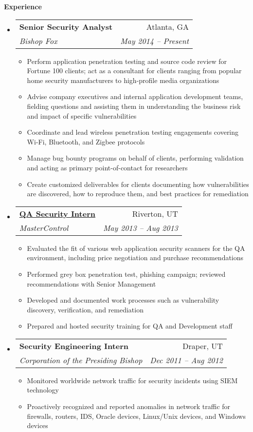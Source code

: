 \documentclass[letterpaper,11pt]{article}
\makeatletter
\newcommand{\resitem}[1]{\item #1 \vspace{-2pt}}
\newcommand{\resheading}[1]{{\large \colorbox{mygrey}{\begin{minipage}{\textwidth}{\textbf{#1 \vphantom{p\^{E}}}}\end{minipage}}}}
\newcommand{\ressubheading}[4]{
\begin{tabular*}{6.5in}{l@{\extracolsep{\fill}}r}
		\textbf{#1} & #2 \\
		\textit{#3} & \textit{#4} \\
\end{tabular*}\vspace{-6pt}}
\makeatother
\begin{document}
\resheading{Experience}
	\begin{itemize}
	\item
			\ressubheading{Senior Security Analyst}{Atlanta, GA}{Bishop Fox}{May 2014 -- Present}
			{ \footnotesize
			\begin{itemize}
				\resitem{Perform application penetration testing and source code review for Fortune 100 clients; act as a consultant for clients ranging from popular home security manufacturers to high-profile media organizations}
				\resitem{Advise company executives and internal application development teams, fielding questions and assisting them in understanding the business risk and impact of specific vulnerabilities}
				\resitem{Coordinate and lead wireless penetration testing engagements covering Wi-Fi, Bluetooth, and Zigbee protocols}
				\resitem{Manage bug bounty programs on behalf of clients, performing validation and acting as primary point-of-contact for researchers}
				\resitem{Create customized deliverables for clients documenting how vulnerabilities are discovered, how to reproduce them, and best practices for remediation}
			\end{itemize}
			}
		\item 
			\ressubheading{\href{}{QA Security Intern}}{Riverton, UT}{MasterControl}{May 2013 -- Aug 2013}
				{ \footnotesize
				\begin{itemize}
					\resitem{Evaluated the fit of various web application security scanners for the QA environment, including price negotiation and purchase recommendations}
					\resitem{Performed grey box penetration test, phishing campaign; reviewed recommendations with Senior Management}
					\resitem{Developed and documented work processes such as vulnerability discovery, verification, and remediation}
					\resitem{Prepared and hosted security training for QA and Development staff}
				\end{itemize}
				}
		\item			
			\ressubheading{Security Engineering Intern}{Draper, UT}{Corporation of the Presiding Bishop}{Dec 2011 -- Aug 2012}
				{ \footnotesize				
				\begin{itemize}
					\resitem{Monitored worldwide network traffic for security incidents using SIEM technology}
					\resitem{Proactively recognized and reported anomalies in network traffic for firewalls, routers, IDS, Oracle devices, Linux/Unix devices, and Windows devices}

\end{itemize}}
\end{itemize}
\end{document}
